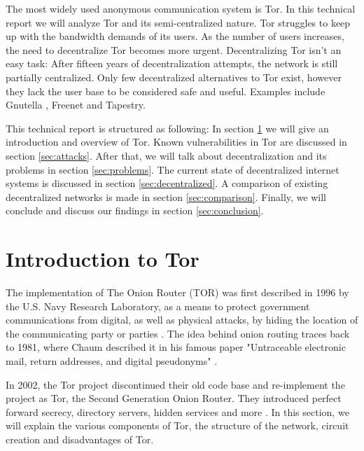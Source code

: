 \documentclass{article}
\begin{document}
	The most widely used anonymous communication system is Tor. In this technical report we will analyze Tor and its semi-centralized nature. Tor struggles to keep up with the bandwidth demands of its users. As the number of users increases, the need to decentralize Tor becomes more urgent. Decentralizing Tor isn't an easy task: After fifteen years of decentralization attempts, the network is still partially centralized. Only few decentralized alternatives to Tor exist, however they lack the user base to be considered safe and useful. Examples include Gnutella \cite{ripeanu2001peer}, Freenet \cite{lua2005survey} and Tapestry.
	
	This technical report is structured as following: In section \ref{sec:tor} we will give an introduction and overview of Tor. Known vulnerabilities in Tor are discussed in section \ref{sec:attacks}. After that, we will talk about decentralization and its problems in section \ref{sec:problems}. The current state of decentralized internet systems is discussed in section \ref{sec:decentralized}. A comparison of existing decentralized networks is made in section \ref{sec:comparison}. Finally, we will conclude and discuss our findings in section \ref{sec:conclusion}.
	
\section{Introduction to Tor}
	\label{sec:tor}
	
	The implementation of The Onion Router (TOR) was first described in 1996 by the U.S. Navy Research Laboratory, as a means to protect government communications from digital, as well as physical attacks, by hiding the location of the communicating party or parties \cite{goldschlag1996hiding}. The idea behind onion routing traces back to 1981, where Chaum described it in his famous paper "Untraceable electronic mail, return addresses, and digital pseudonyms" \cite{chaum1981untraceable}.
	
	In 2002, the Tor project discontinued their old code base and re-implement the project as Tor, the Second Generation Onion Router. They introduced perfect forward secrecy, directory servers, hidden services and more \cite{dingledine2004tor}. In this section, we will explain the various components of Tor, the structure of the network, circuit creation and disadvantages of Tor.
	
\end{document}

